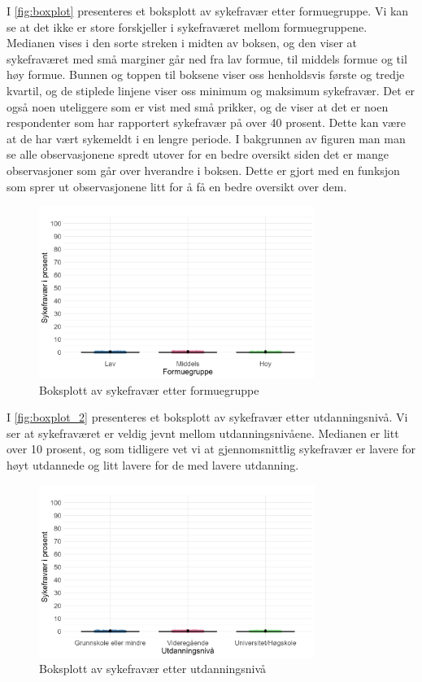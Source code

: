 \documentclass[
  12pt,
  a4paper,
  DIV=11,
  numbers=noendperiod]{scrartcl}
\begin{document}
I \autoref{fig:boxplot} presenteres et boksplott av sykefravær etter
formuegruppe. Vi kan se at det ikke er store forskjeller i sykefraværet
mellom formuegruppene. Medianen vises i den sorte streken i midten av
boksen, og den viser at sykefraværet med små marginer går ned fra lav
formue, til middels formue og til høy formue. Bunnen og toppen til
boksene viser oss henholdsvis første og tredje kvartil, og de stiplede
linjene viser oss minimum og maksimum sykefravær. Det er også noen
uteliggere som er vist med små prikker, og de viser at det er noen
respondenter som har rapportert sykefravær på over 40 prosent. Dette kan
være at de har vært sykemeldt i en lengre periode. I bakgrunnen av
figuren man man se alle observasjonene spredt utover for en bedre
oversikt siden det er mange observasjoner som går over hverandre i
boksen. Dette er gjort med en funksjon som sprer ut observasjonene litt
for å få en bedre oversikt over dem.

\begin{figure}[H]
\caption{Boksplott av sykefravær etter formuegruppe}
\label{fig:boxplot}
\centering
\includegraphics[width=0.8\textwidth]{dokumentobjekter/figurer/fig_6.png}
\end{figure}

I \autoref{fig:boxplot_2} presenteres et boksplott av sykefravær etter
utdanningsnivå. Vi ser at sykefraværet er veldig jevnt mellom
utdanningsnivåene. Medianen er litt over 10 prosent, og som tidligere
vet vi at gjennomsnittlig sykefravær er lavere for høyt utdannede og
litt lavere for de med lavere utdanning.

\begin{figure}[H]
\caption{Boksplott av sykefravær etter utdanningsnivå}
\label{fig:boxplot_2}
\centering
\includegraphics[width=0.8\textwidth]{dokumentobjekter/figurer/fig_7.png}
\end{figure}
\end{document}
